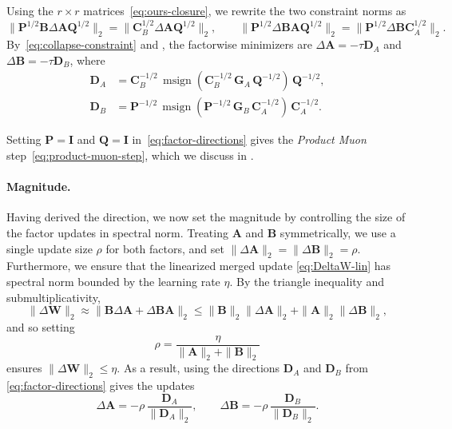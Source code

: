 \documentclass{article}
\newcommand{\mat}[1]{\bm{#1}}
\DeclareMathOperator{\msign}{msign}          %
\newcommand{\norm}[1]{\| #1\|}
\begin{document}
Using the $r\times r$ matrices~\eqref{eq:ours-closure}, we rewrite the two constraint norms as
\begin{equation} \label{eq:collapse-constraint}
\norm{\mat{P}^{1/2}\mat{B}\Delta\mat{A} \mat{Q}^{1/2}}_2=\norm{\mat{C}_B^{1/2}\Delta\mat{A} \mat{Q}^{1/2}}_2,
\qquad
\norm{\mat{P}^{1/2}\Delta\mat{B} \mat{A} \mat{Q}^{1/2}}_2=\norm{\mat{P}^{1/2}\Delta\mat{B} \mat{C}_A^{1/2}}_2 .
\end{equation}
By~\eqref{eq:collapse-constraint} and ,
 the factorwise minimizers are $\Delta\mat{A}=-\tau\mat{D}_A$ 
 and $\Delta\mat{B}=-\tau\mat{D}_B$, where
\begin{equation}
  \begin{aligned}
  \mat{D}_A &=
  \mat{C}_B^{-1/2}\,
  \msign\!\left(\mat{C}_B^{-1/2}\,\mat{G}_A\,\mat{Q}^{-1/2}\right)
  \,\mat{Q}^{-1/2},\\
  \mat{D}_B &=
  \mat{P}^{-1/2}\,
  \msign\!\left(\mat{P}^{-1/2}\,\mat{G}_B\,\mat{C}_A^{-1/2}\right)
  \,\mat{C}_A^{-1/2}.
  \end{aligned}
  \label{eq:factor-directions}
\end{equation} 

Setting $\mat{P}=\mat{I}$ and $\mat{Q}=\mat{I}$ in~\eqref{eq:factor-directions}
gives the \emph{Product Muon} step~\eqref{eq:product-muon-step}, which we discuss in .


\paragraph{Magnitude.}
Having derived the direction, we now set the magnitude by controlling the size of the factor updates in spectral norm. Treating $\mat{A}$ and $\mat{B}$ symmetrically, we use a single update size $\rho$ for both factors, and set $\norm{\Delta\mat{A}}_2=\norm{\Delta\mat{B}}_2=\rho$. Furthermore, we ensure that the linearized merged update \eqref{eq:DeltaW-lin} has spectral norm bounded by the learning rate $\eta$. By the triangle inequality and submultiplicativity,
\begin{equation}
\norm{\Delta\mat{W}}_2
\approx
\norm{\mat{B}\Delta\mat{A}+\Delta\mat{B} \mat{A}}_2
\le
\norm{\mat{B}}_2\norm{\Delta\mat{A}}_2
+
\norm{\mat{A}}_2\norm{\Delta\mat{B}}_2,
\label{eq:ours-prodcap}
\end{equation}
and so setting
\begin{equation}
\rho = \frac{\eta}{\norm{\mat{A}}_2+\norm{\mat{B}}_2}
\label{eq:ours-rho}
\end{equation}
ensures $\norm{\Delta\mat{W}}_2\leq \eta$. As a result, using the directions $\mat{D}_A$ and $\mat{D}_B$ from \eqref{eq:factor-directions} gives the updates
\begin{equation}
\Delta\mat{A} = -\rho\,\frac{\mat{D}_A}{\norm{\mat{D}_A}_2},
\qquad
\Delta\mat{B} = -\rho\,\frac{\mat{D}_B}{\norm{\mat{D}_B}_2}.
\label{eq:polora-update}
\end{equation}
\end{document}
